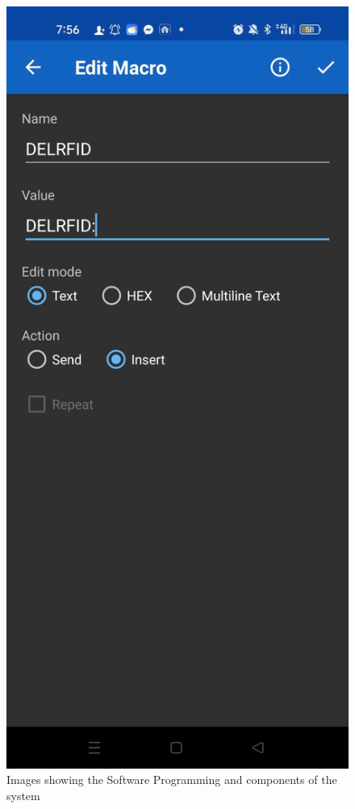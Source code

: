 \documentclass[conference, onecolumn]{IEEEtran}
\begin{document}
\begin{figure}[H]
\begin{minipage}[b]{0.3\textwidth}
	\end{minipage}
	\hspace{0.03\textwidth}
	\begin{minipage}[b]{0.3\textwidth}
		\centering
		\includegraphics[width=\textwidth]{z6844982497362_0006d2a3461fe6047543e0bac1fd5f71.jpg}
	\end{minipage}
	\caption{Images showing the Software Programming and components of the system}
\end{figure}
\end{document}
